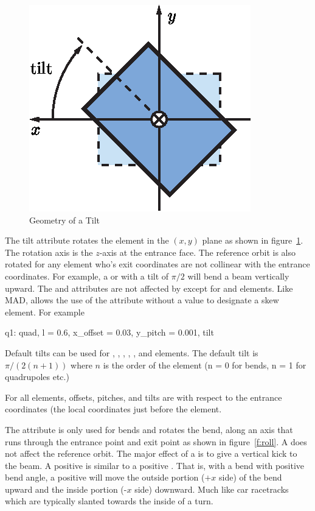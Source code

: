 \begin{figure}[t]
  \centering
  \includegraphics{tilt.eps}
  \caption{Geometry of a Tilt}
  \label{f:tilt}
\end{figure}

The tilt attribute rotates the element in the $(x, y)$ plane as shown
in figure~\ref{f:tilt}. The rotation axis is the $z$-axis at the
entrance face. The reference orbit is also rotated for any element
who's exit coordinates are not collinear with the entrance
coordinates. For example, a  or  with a tilt of
$\pi/2$ will bend a beam vertically upward. The  and
 attributes are not affected by  except for
 and  elements. Like MAD, \bmad allows the
use of the  attribute without a value to designate a skew
element. For example
\begin{example}
  q1: quad, l = 0.6, x_offset = 0.03, y_pitch = 0.001, tilt
\end{example}
Default tilts can be used for , , ,
, , and  elements.
The default tilt is $\pi/(2(n+1))$ where $n$ is the order of the 
element (n = 0 for bends, n = 1 for quadrupoles etc.) 

For all elements, offsets, pitches, and tilts are with respect to the
entrance coordinates (the local coordinates just before the element.

The  attribute is only used for bends and rotates the bend,
along an axis that runs through the entrance point and exit point as
shown in figure~\ref{f:roll}. A  does not affect the
reference orbit. The major effect of a  is to give a vertical
kick to the beam. A positive  is similar to a positive
. That is, with a bend with positive bend angle, a positive
 will move the outside portion ($+x$ side) of the bend upward
and the inside portion (-$x$ side) downward. Much like car racetracks
which are typically slanted towards the inside of a turn.

